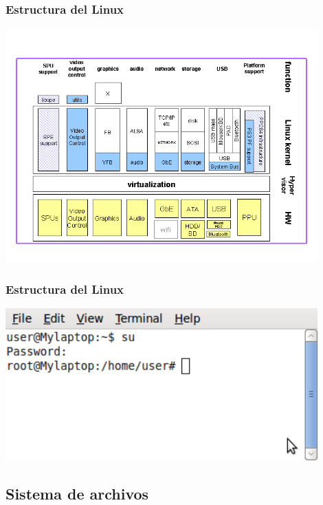 \documentclass[colorlinks,10pt]{beamer}
\begin{document}
\begin{frame}
  \frametitle{Estructura del Linux}
  \begin{center}
    \includegraphics[width=0.9\textwidth]{figs/kernel} \\
  \end{center}
\end{frame}


\begin{frame}
  \frametitle{Estructura del Linux}
  \begin{center}
    \includegraphics[width=0.9\textwidth]{figs/root-user} \\
  \end{center}
\end{frame}

\subsection{Sistema de archivos}
\end{document}
